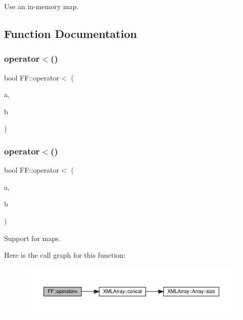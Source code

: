 Use an in-\/memory map. 



\subsection{Function Documentation}
\mbox{\label{namespaceFF_a84e77b5ad9222ac85655c36949abf276}} 
\subsubsection{\texorpdfstring{operator$<$()}{operator<()}\hspace{0.1cm}{\footnotesize\ttfamily [1/2]}}
{\footnotesize\ttfamily bool F\+F\+::operator$<$ (\begin{DoxyParamCaption}\item[{const \mbox{\hyperlink{structFF_1_1DiscoKeyOperator__t}{Disco\+Key\+Operator\+\_\+t}} \&}]{a,  }\item[{const \mbox{\hyperlink{structFF_1_1DiscoKeyOperator__t}{Disco\+Key\+Operator\+\_\+t}} \&}]{b }\end{DoxyParamCaption})}

\mbox{\label{namespaceFF_ab2fad4623f8e931f162863b3dbff7a29}} 
\subsubsection{\texorpdfstring{operator$<$()}{operator<()}\hspace{0.1cm}{\footnotesize\ttfamily [2/2]}}
{\footnotesize\ttfamily bool F\+F\+::operator$<$ (\begin{DoxyParamCaption}\item[{const \mbox{\hyperlink{structFF_1_1PiPf}{Pi\+Pf}} \&}]{a,  }\item[{const \mbox{\hyperlink{structFF_1_1PiPf}{Pi\+Pf}} \&}]{b }\end{DoxyParamCaption})}



Support for maps. 

Here is the call graph for this function\+:\nopagebreak
\begin{figure}[H]
\begin{center}
\leavevmode
\includegraphics[width=350pt]{d5/da6/namespaceFF_ab2fad4623f8e931f162863b3dbff7a29_cgraph}
\end{center}
\end{figure}
\mbox{\label{namespaceFF_ac2ee6d46f8316f1f3631105fbeab604c}} 
